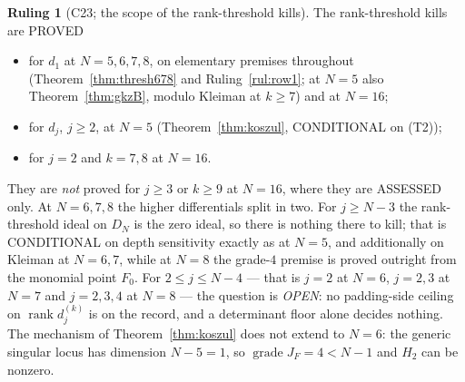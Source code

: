 \documentclass[11pt]{amsart}
\theoremstyle{plain}
\theoremstyle{definition}
\newtheorem{ruling}[theorem]{Ruling}
\theoremstyle{remark}
\DeclareMathOperator{\rank}{rank}
\newcommand{\prov}[3]{\par\smallskip\noindent{\footnotesize\textsf{[\,label: #1\ \textbar\ source: #2\ \textbar\ lineage: #3\,]}}\par\smallskip}
\newcommand{\cid}[1]{\textsf{#1}}
\newcommand{\cm}[1]{\texttt{#1}}
\begin{document}
\begin{ruling}[\cid{C23}; the scope of the rank-threshold kills]\label{rul:scope}
The rank-threshold kills are PROVED
\begin{itemize}
\item for $d_1$ at $N=5,6,7,8$, on elementary premises throughout (Theorem~\ref{thm:thresh678}
and Ruling~\ref{rul:row1}; at $N=5$ also Theorem~\ref{thm:gkzB}, modulo Kleiman at $k\ge7$) and
at $N=16$;
\item for $d_j$, $j\ge2$, at $N=5$ (Theorem~\ref{thm:koszul}, CONDITIONAL on (T2));
\item for $j=2$ and $k=7,8$ at $N=16$.
\end{itemize}
They are \emph{not} proved for $j\ge3$ or $k\ge9$ at $N=16$, where they are ASSESSED only. At
$N=6,7,8$ the higher differentials split in two. For $j\ge N-3$ the rank-threshold ideal on
$D_N$ is the zero ideal, so there is nothing there to kill; that is CONDITIONAL on depth
sensitivity exactly as at $N=5$, and additionally on Kleiman at $N=6,7$, while at $N=8$ the
grade-$4$ premise is proved outright from the monomial point $F_0$. For $2\le j\le N-4$ --- that
is $j=2$ at $N=6$, $j=2,3$ at $N=7$ and $j=2,3,4$ at $N=8$ --- the question is \emph{OPEN}: no
padding-side ceiling on $\rank d_j^{(k)}$ is on the record, and a determinant floor alone decides
nothing. The mechanism of Theorem~\ref{thm:koszul} does not extend to $N=6$: the generic singular
locus has dimension $N-5=1$, so $\operatorname{grade}J_F=4<N-1$ and $H_2$ can be nonzero.
\end{ruling}
\prov{ruling. Updated 2026-09-20: B22-10's ASSESSED label for $d_1$ at $N=6,7,8$ is DISCHARGED by Theorem~\ref{thm:thresh678}; the $j\ge2$ split at $N=6,7,8$ is new here and carries its conditions. Updated 2026-09-21: the $d_1$ kill at $N=5$ no longer needs Kleiman (Ruling~\ref{rul:row1}); the Kleiman premise of the $j\ge N-3$ clause at $N=6,7$ is a different use and is untouched. The $N=16$ scope is unchanged}{B22-10 \S6, S19, S21 @ \cm{2efb7aaf}; B22-12 ledger \S4 correction~1 @ \cm{16f2392e}; B23-03 \S3.3, L14--L16 @ \cm{3bcad666}; B23-10 \S3.2 and ruling B23-10.9 @ \cm{239dd6e8}; B24-02 \S4.4, \S5 @ \cm{f8273c3b}}{reviewer B22-10 (READ) for the $N=16$ scope; producer B23-03 for the $N=6,7,8$ split; reviewer B23-10 (READ + INDEPENDENT EVALUATOR) for the $d_1$ discharge. The $2\le j\le N-4$ row is producer B23-03 only, and is a statement that nothing is known}
\end{document}
